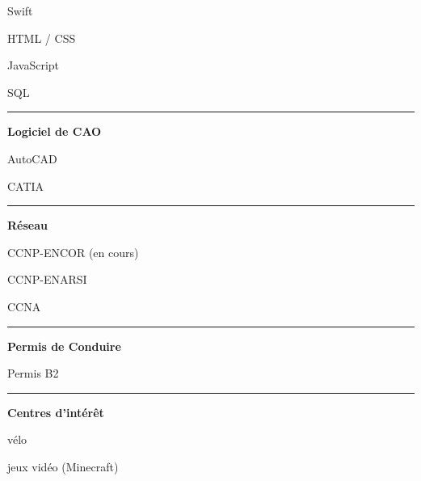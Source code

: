 \documentclass[a4paper]{letter}
\newcommand{\divider}{\rule{\linewidth}{0.9pt}}
\begin{document}
\begin{minipage}[t]{0.40\textwidth}
\faCircleNotch \quad Swift

\faCircleNotch \quad HTML / CSS

\faCircleNotch \quad JavaScript

\faCircleNotch \quad SQL

\divider


{\large \textbf{Logiciel de CAO}}

\faCircleNotch \quad AutoCAD

\faCircleNotch \quad CATIA

\divider



{\large \textbf{Réseau}}

\faNetworkWired \quad CCNP-ENCOR (en cours)

\faNetworkWired \quad CCNP-ENARSI

\faNetworkWired \quad CCNA


\divider

{\large \textbf{Permis de Conduire}}

\faCar \quad Permis B2

\divider

{\large \textbf{Centres d'intérêt}}

\faBicycle \quad vélo

\faGamepad \quad jeux vidéo (Minecraft)


\end{minipage}
\hfill
\end{document}
